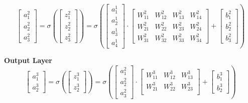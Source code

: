 \documentclass[12pt]{article}
\begin{document}
\begin{equation}
\begin{bmatrix}
a_{1}^{2}\\
a_{2}^{2}\\
a_{3}^{2}
\end{bmatrix}
=
\sigma
\left(
\begin{bmatrix}
z_{1}^{2}\\
z_{2}^{2}\\
z_{3}^{2}
\end{bmatrix}
\right)
=
\sigma
\left(
\begin{bmatrix}
a_{1}^{1}\\
a_{2}^{1}\\
a_{3}^{1}\\
a_{4}^{1}
\end{bmatrix}
\cdot
\begin{bmatrix}
W_{11}^{2} & W_{12}^{2} & W_{13}^{2} & W_{14}^{2} \\
W_{21}^{2} & W_{22}^{2} & W_{23}^{2} & W_{24}^{2} \\
W_{31}^{2} & W_{32}^{2} & W_{33}^{2} & W_{34}^{2} \end{bmatrix}
 +
 \begin{bmatrix}
b_{1}^{2}\\
b_{2}^{2}\\
b_{3}^{2}
\end{bmatrix}
\right)
\end{equation}


\textbf{Output Layer}
\begin{equation}
\begin{bmatrix}
a_{1}^{3}\\
a_{2}^{3}
\end{bmatrix}
=
\sigma
\left(
\begin{bmatrix}
z_{1}^{3}\\
z_{2}^{3}
\end{bmatrix}
\right)
=
\sigma
\left(
\begin{bmatrix}
a_{1}^{2}\\
a_{2}^{2}\\
a_{3}^{2}
\end{bmatrix}
\cdot
\begin{bmatrix}
W_{11}^{3} & W_{12}^{3} & W_{13}^{3} \\
W_{21}^{3} & W_{22}^{3} & W_{23}^{3} \\ 
\end{bmatrix}
 +
 \begin{bmatrix}
b_{1}^{3}\\
b_{2}^{3}
\end{bmatrix}
\right)
\end{equation}
\end{document}

